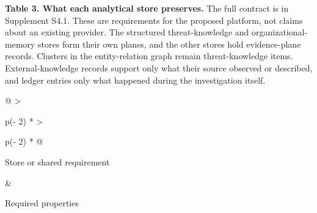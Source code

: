 \documentclass[
  11pt,
]{article}
\renewcommand{\arraystretch}{1.12}
\begin{document}
\begin{table}[tp]
\textbf{Table 3. What each analytical store preserves.} The full
contract is in Supplement S4.1. These are requirements for the proposed
platform, not claims about an existing provider. The structured
threat-knowledge and organizational-memory stores form their own planes,
and the other stores hold evidence-plane records. Clusters in the
entity-relation graph remain threat-knowledge items. External-knowledge
records support only what their source observed or described, and ledger
entries only what happened during the investigation itself.\par
{\small\renewcommand{\arraystretch}{1.04}
\begin{tabular}{@{}
  >{\raggedright\arraybackslash}p{(\columnwidth - 2\tabcolsep) * }
  >{\raggedright\arraybackslash}p{(\columnwidth - 2\tabcolsep) * }@{}}
\toprule\noalign{}
\begin{minipage}[b]{\linewidth}\raggedright
Store or shared requirement
\end{minipage} & \begin{minipage}[b]{\linewidth}\raggedright
Required properties
\end{minipage} \\
\midrule\noalign{}


\end{tabular}}
\end{table}
\end{document}
